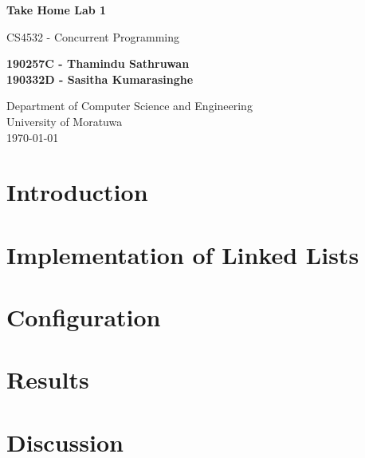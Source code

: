 \documentclass[a4paper,12pt]{article}
\begin{document}
\begin{titlepage}
    \begin{center}
        \vspace*{1cm}

        \LARGE
        \textbf{Take Home Lab 1}

        \vspace{0.5cm}

        \large
        CS4532 - Concurrent Programming

        \vspace{1.5cm}

        \textbf{190257C - Thamindu Sathruwan\\190332D - Sasitha Kumarasinghe}

        \vfill

        \normalsize
        Department of Computer Science and Engineering\\
        University of Moratuwa\\
        \today

    \end{center}
\end{titlepage}

\tableofcontents
\newpage

\section{Introduction}

\section{Implementation of Linked Lists}

\section{Configuration}

\section{Results}

\section{Discussion}
\end{document}
